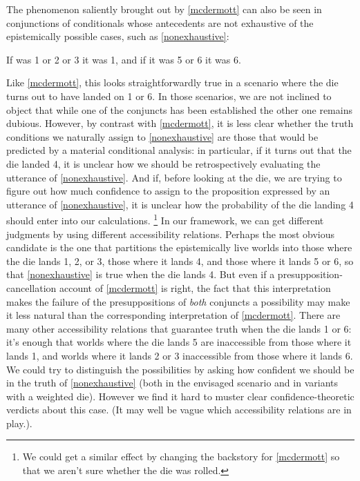 \documentclass[If.tex]{subfiles}
\begin{document}
The phenomenon saliently brought out by \ref{mcdermott} can also be seen in conjunctions of conditionals whose antecedents are not exhaustive of the epistemically possible cases, such as \ref{nonexhaustive}:
\begin{prop}
	\nitem \label{nonexhaustive}
	If was 1 or 2 or 3 it was 1, and if it was 5 or 6 it was 6.
\end{prop}
Like \ref{mcdermott}, this looks straightforwardly true in a scenario where the die turns out to have landed on 1 or 6.  In those scenarios, we are not inclined to object that while one of the conjuncts has been established the other one remains dubious.  However, by contrast with \ref{mcdermott}, it is less clear whether the truth conditions we naturally assign to \ref{nonexhaustive} are those that would be predicted by a material conditional analysis: in particular, if it turns out that the die landed 4, it is unclear how we should be retrospectively evaluating the utterance of \ref{nonexhaustive}.  And if, before looking at the die, we are trying to figure out how much confidence to assign to the proposition expressed by an utterance of \ref{nonexhaustive}, it is unclear how the probability of the die landing 4 should enter into our calculations.%
\footnote{We could get a similar effect by changing the backstory for \ref{mcdermott} so that we aren't sure whether the die was rolled.}
In our framework, we can get different judgments by using different accessibility relations.  Perhaps the most obvious candidate is the one that partitions the epistemically live worlds into those where the die lands 1, 2, or 3, those where it lands 4, and those where it lands 5 or 6, so that \ref{nonexhaustive} is true when the die lands 4.  But even if a presupposition-cancellation account of \ref{mcdermott} is right, the fact that this interpretation makes the failure of the presuppositions of \emph{both} conjuncts a possibility may make it less natural than the corresponding interpretation of \ref{mcdermott}.  There are many other accessibility relations that guarantee truth when the die lands 1 or 6: it's enough that worlds where the die lands 5 are inaccessible from those where it lands 1, and worlds where it lands 2 or 3 inaccessible from those where it lands 6.  We could try to distinguish the possibilities by asking how confident we should be in the truth of \ref{nonexhaustive} (both in the envisaged scenario and in variants with a weighted die).  However we find it hard to muster clear confidence-theoretic verdicts about this case.  (It may well be vague which accessibility relations are in play.).%
\end{document}

